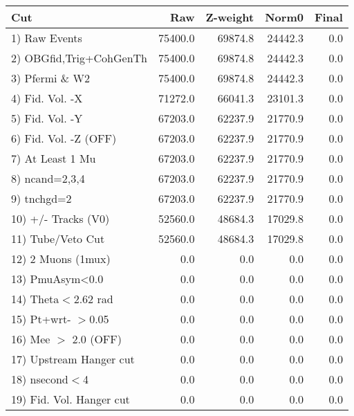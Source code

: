  \begin{table}[h!]\centering
 \begin{tabular}{||l||r|r|r|r||}
 \hline
 \hline
 Cut & Raw & Z-weight & Norm0 & Final \\
 \hline
  1) Raw Events           &     75400.0 &     69874.8 &     24442.3 &         0.0 \\
  2) OBGfid,Trig+CohGenTh &     75400.0 &     69874.8 &     24442.3 &         0.0 \\
  3) Pfermi \& W2         &     75400.0 &     69874.8 &     24442.3 &         0.0 \\
  4) Fid. Vol. -X         &     71272.0 &     66041.3 &     23101.3 &         0.0 \\
  5) Fid. Vol. -Y         &     67203.0 &     62237.9 &     21770.9 &         0.0 \\
  6) Fid. Vol. -Z (OFF)   &     67203.0 &     62237.9 &     21770.9 &         0.0 \\
  7) At Least 1 Mu        &     67203.0 &     62237.9 &     21770.9 &         0.0 \\
  8) ncand=2,3,4          &     67203.0 &     62237.9 &     21770.9 &         0.0 \\
  9) tnchgd=2             &     67203.0 &     62237.9 &     21770.9 &         0.0 \\
 10) +/- Tracks (V0)      &     52560.0 &     48684.3 &     17029.8 &         0.0 \\
 11) Tube/Veto Cut        &     52560.0 &     48684.3 &     17029.8 &         0.0 \\
 12) 2 Muons (1mux)       &         0.0 &         0.0 &         0.0 &         0.0 \\
 13) PmuAsym<0.0          &         0.0 &         0.0 &         0.0 &         0.0 \\
 14) Theta$<$2.62 rad     &         0.0 &         0.0 &         0.0 &         0.0 \\
 15) Pt+wrt- $>$0.05      &         0.0 &         0.0 &         0.0 &         0.0 \\
 16) Mee $>$ 2.0  (OFF)   &         0.0 &         0.0 &         0.0 &         0.0 \\
 17) Upstream Hanger cut  &         0.0 &         0.0 &         0.0 &         0.0 \\
 18) nsecond$<$4          &         0.0 &         0.0 &         0.0 &         0.0 \\
 19) Fid. Vol. Hanger cut &         0.0 &         0.0 &         0.0 &         0.0 \\

\end{tabular}
\end{table}
